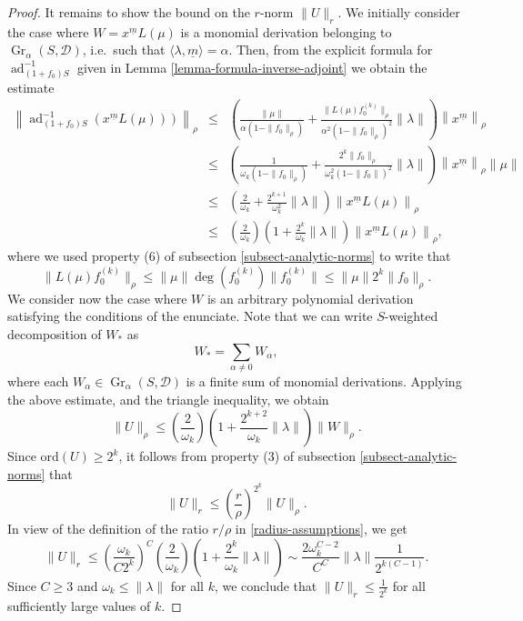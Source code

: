 \documentclass[10pt,twoside,reqno]{amsart}
\theoremstyle{remark}
\theoremstyle{remark}
\newcommand{\um}{{\underline m}}
\newcommand{\ad}{\operatorname{ad}}
\newcommand{\tmop}[1]{{\operatorname{#1}}}
\newcommand{\Gr}{\operatorname{Gr}}
\newcommand{\ord}{\mathrm{ord}}
\newcommand{\cD}{\mathcal{D}}
\begin{document}
\begin{proof}
  It remains to show the bound on the $r$-norm $\| U \|_r$. We initially consider the case where $W = x^{\um}  L (\mu)$ is a monomial derivation
  belonging to $\Gr_{\alpha} \left( S, \cD \right)$, i.e.~such that $\langle \lambda,\um\rangle = \alpha$. Then, from the
  explicit formula for $\tmop{ad}_{(1 + f_0) S}^{-1}$ given in Lemma
  \ref{lemma-formula-inverse-adjoint} we obtain the estimate
  \begin{eqnarray*}
    \left\| \ad_{(1 + f_0) S}^{- 1}  \left( \left. x^{\um}  L (\mu) \right)
    \right) \right\|_{\rho} & \leqslant &  \left(  \frac{\| \mu \|}{\alpha (1
    - \| f_0  \|_\rho)} + \frac{\| L (\mu) f_0^{(k)} \|_{\rho}}{\alpha^2  (1 - \|
    f_0 \|_\rho)^2}  \| \lambda \|  \right) \left\| x^{\um} \right\|_{\rho}\\
    & \leqslant &  \left(  \frac{1}{\omega_k  (1 - \| f_0  \|_\rho)} + \frac{2^{k
    } \| f_0 \|_{\rho}}{\omega_k^2 (1 - \| f_0 \|)^2}  \| \lambda \|
    \right)  \left\| x^{\um} \right\|_{\rho} \| \mu \| \\
    & \leqslant & \left(  \frac{2}{\omega_k } + \frac{2^{k + 1}}{\omega_k^2} 
    \| \lambda \| \right) \left\| x^{\um} L (\mu) \right\|_{\rho}\\
    & \leqslant & \left( \frac{2}{\omega_k} \right)  \left( 1 + \frac{2^{k }}{\omega_k}   \| \lambda \| \right) \left\| x^{\um} L (\mu)
    \right\|_{\rho},
  \end{eqnarray*}
  where we used property (6) of subsection \ref{subsect-analytic-norms} to
  write that
  \[ \| L (\mu) f_0^{(k)} \|_{\rho} \leqslant \| \mu \| \deg (f_0^{(k)})  \|
     f_0^{(k)} \| \leqslant \| \mu \| 2^{k } \| f_0 \|_{\rho}. \]
  We consider now the case where $W$ is an arbitrary polynomial derivation satisfying the conditions of the enunciate. Note that we
  can write $S$-weighted decomposition of $W_{\ast}$ as
  \[ W_{\ast} = \sum_{\alpha \neq 0} W_{\alpha}, \]
  where each $W_{\alpha} \in \tmop{Gr}_{\alpha} \left( S, \cD \right)$ is a
  finite sum of monomial derivations. Applying the above estimate, and the
  triangle inequality, we obtain
  \[ \| U \|_{\rho} \leqslant \left( \frac{2}{\omega_k} \right)  \left( 1 +
     \frac{2^{k + 2}}{\omega_k}   \| \lambda \| \right)  \| W \|_{\rho}. \]
  Since $\ord (U) \geqslant 2^k$, it follows from property (3) of subsection
  \ref{subsect-analytic-norms} that
  \[ \| U \|_r \leqslant \left( \frac{r}{\rho} \right)^{2^k} \| U \|_{\rho}. \]
  In view of the definition of the ratio $r/\rho$ in \eqref{radius-assumptions}, we get
  \[ \| U \|_r \leqslant \left( \frac{\omega_k}{C 2^k} \right)^C \left(
     \frac{2}{\omega_k} \right)  \left( 1 + \frac{2^{k }}{\omega_k}   \|
     \lambda \| \right) \sim \frac{2 \omega_k^{C - 2} }{ C^C} \| \lambda \|
     \frac{1}{2^{k (C - 1)}}. \]
 Since $C \ge 3$ and $\omega_k \le \|\lambda\|$ for all $k$, we conclude that $\| U  \|_r \leqslant
  \frac{1}{2^k}$ for all sufficiently large values of $k$. 
\end{proof}
\end{document}
